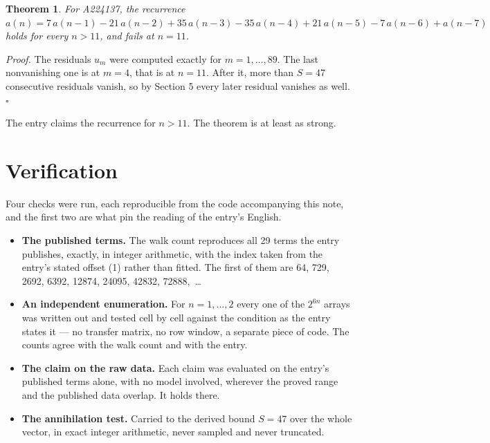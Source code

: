 \documentclass[11pt]{article}
\newtheorem{theorem}{Theorem}
\theoremstyle{definition}
\begin{document}
\begin{theorem} For A224137, the recurrence $a(n) = 7\,a(n-1) - 21\,a(n-2) + 35\,a(n-3) - 35\,a(n-4) + 21\,a(n-5) - 7\,a(n-6) + a(n-7)$ holds for every $n > 11$, and fails at $n = 11$.\end{theorem}

{\itshape Proof.} The residuals $u_m$ were computed exactly for $m = 1,\dots,89$. The last nonvanishing one is at $m = 4$, that is at $n = 11$. After it, more than $S = 47$ consecutive residuals vanish, so by Section 5 every later residual vanishes as well. $\square$

The entry claims the recurrence for $n > 11$. The theorem is at least as strong.

\section{Verification}

Four checks were run, each reproducible from the code accompanying this note, and the first two are what pin the reading of the entry's English.

\begin{itemize}

\item {\bfseries The published terms.} The walk count reproduces all 29 terms the entry publishes, exactly, in integer arithmetic, with the index taken from the entry's stated offset (1) rather than fitted. The first of them are 64, 729, 2692, 6392, 12874, 24095, 42832, 72888,~\dots

\item {\bfseries An independent enumeration.} For $n = 1,\dots,2$ every one of the $2^{6n}$ arrays was written out and tested cell by cell against the condition as the entry states it --- no transfer matrix, no row window, a separate piece of code. The counts agree with the walk count and with the entry.

\item {\bfseries The claim on the raw data.} Each claim was evaluated on the entry's published terms alone, with no model involved, wherever the proved range and the published data overlap. It holds there.

\item {\bfseries The annihilation test.} Carried to the derived bound $S = 47$ over the whole vector, in exact integer arithmetic, never sampled and never truncated.

\end{itemize}
\end{document}
